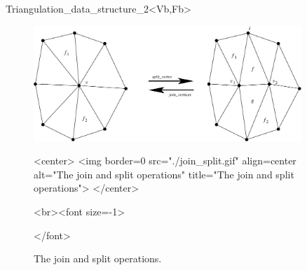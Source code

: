 \begin{ccRefClass}{Triangulation_data_structure_2<Vb,Fb>}
\begin{figure}[hb]
\begin{ccTexOnly}
\begin{center}
\includegraphics[width=0.9\textwidth]{TDS_2_ref/join_split}
\end{center}
\end{ccTexOnly}
\begin{ccHtmlOnly}
<center>
<img border=0 src="./join_split.gif" align=center
alt="The join and split operations"
title="The join and split operations">
</center>
\end{ccHtmlOnly}
\begin{ccHtmlOnly}
<br><font size=-1>
\end{ccHtmlOnly}
\caption{The join and split operations.}\label{fig-tds-split-join}
\begin{ccHtmlOnly}
</font>
\end{ccHtmlOnly}
\end{figure}


\end{ccRefClass}
